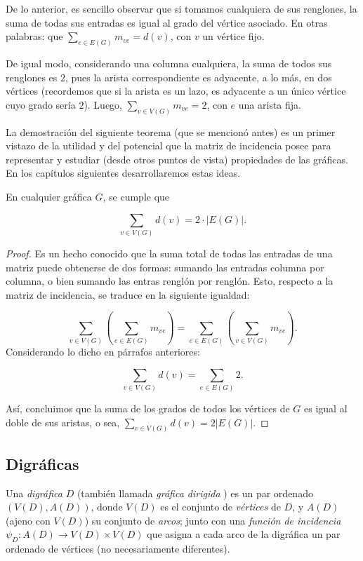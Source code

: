 De lo anterior, es sencillo observar que si tomamos cualquiera de sus renglones, la suma de todas sus entradas es igual al grado del vértice asociado. En otras palabras: que $\sum_{e \in E(G)}m_{ve} = d(v)$, con $v$ un vértice fijo.

De igual modo, considerando una columna cualquiera, la suma de todos sus renglones es $2$, pues la arista correspondiente es adyacente, a lo más, en dos vértices (recordemos que si la arista es un lazo, es adyacente a un único vértice cuyo grado sería $2$). Luego, $\sum_{v \in V(G)}m_{ve} = 2$, con $e$ una arista fija.

La demostración del siguiente teorema (que se mencionó antes) es un primer vistazo de la utilidad y del potencial que la matriz de incidencia posee para representar y estudiar (desde otros puntos de vista) propiedades de las gráficas. En los capítulos siguientes desarrollaremos estas ideas.


\begin{teo}
En cualquier gráfica $G$, se cumple que

$$
\sum_{v \in V(G)} d(v) = 2 \cdot|E(G)|. 
$$
\end{teo}

\begin{proof}
Es un hecho conocido que la suma total de todas las entradas de una matriz puede obtenerse de dos formas: sumando las entradas columna por columna, o bien sumando las entras renglón por renglón. Esto, respecto a la matriz de incidencia, se traduce en la siguiente igualdad:

$$
\sum_{v \in V(G)} (\sum_{e \in E(G)} m_{ve}) = \sum_{e \in E(G)} (\sum_{v \in V(G)} m_{ve}).
$$
Considerando lo dicho en párrafos anteriores:

$$
\sum_{v \in V(G)} d(v) = \sum_{e \in E(G)} 2.
$$

Así, concluimos que la suma de los grados de todos los vértices de $G$ es igual al doble de sus aristas, o sea, $\sum_{v \in V(G)} d(v) = 2 |E(G)|$.

\end{proof}

        \subsection{Digráficas} \label{sec:queesunadigrafica}

Una \textit{digráfica}  $D$ (también llamada \textit{gráfica dirigida} ) es un par ordenado $(V(D), A(D))$, donde $V(D)$ es el conjunto de \textit{vértices} de $D$, y $A(D)$ (ajeno con $V(D)$) su conjunto de \textit{arcos}; junto con una \textit{función de incidencia} 
 $\psi_D \colon A(D) \rightarrow V(D) \times V(D)$ que asigna a cada arco de la digráfica un par ordenado de vértices (no necesariamente diferentes).
 
